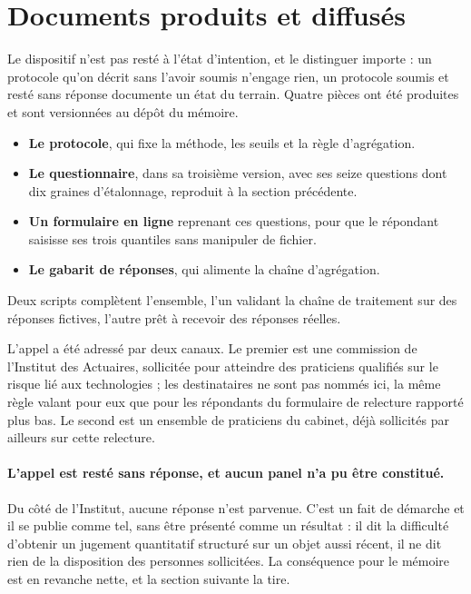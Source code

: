 \vspace{2pt}

\section{Documents produits et diffusés}


Le dispositif n'est pas resté à l'état d'intention, et le distinguer importe : un protocole qu'on
décrit sans l'avoir soumis n'engage rien, un protocole soumis et resté sans réponse documente un
état du terrain. Quatre pièces ont été produites et sont versionnées au dépôt du mémoire.

\begin{itemize}[itemsep=2pt,topsep=3pt]
\item \textbf{Le protocole}, qui fixe la méthode, les seuils et la règle d'agrégation.
\item \textbf{Le questionnaire}, dans sa troisième version, avec ses seize questions dont dix
      graines d'étalonnage, reproduit à la section précédente.
\item \textbf{Un formulaire en ligne} reprenant ces questions, pour que le répondant saisisse
      ses trois quantiles sans manipuler de fichier.
\item \textbf{Le gabarit de réponses}, qui alimente la chaîne d'agrégation.
\end{itemize}

Deux scripts complètent l'ensemble, l'un validant la chaîne de traitement sur des réponses
fictives, l'autre prêt à recevoir des réponses réelles.

L'appel a été adressé par deux canaux. Le premier est une commission de l'Institut des Actuaires,
sollicitée pour atteindre des praticiens qualifiés sur le risque lié aux technologies ; les
destinataires ne sont pas nommés ici, la même règle valant pour eux que pour les répondants du
formulaire de relecture rapporté plus bas. Le second est un ensemble de praticiens du cabinet,
déjà sollicités par ailleurs sur cette relecture.

\paragraph{L'appel est resté sans réponse, et aucun panel n'a pu être constitué.} Du côté de
l'Institut, aucune réponse n'est parvenue. C'est un fait de démarche et il se publie comme tel,
sans être présenté comme un résultat : il dit la difficulté d'obtenir un jugement quantitatif
structuré sur un objet aussi récent, il ne dit rien de la disposition des personnes sollicitées.
La conséquence pour le mémoire est en revanche nette, et la section suivante la tire.

